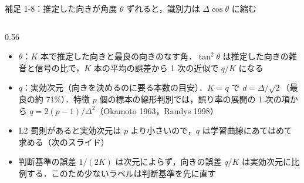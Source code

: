 \begin{frame}{補足 1-8：推定した向きが角度 $\theta$ ずれると，識別力は $\Delta\cos\theta$ に縮む}
\begin{columns}[T,onlytextwidth]
\begin{column}{0.56\textwidth}
\begin{itemize}
        \item $\theta$：$K$ 本で推定した向きと最良の向きのなす角．$\tan^2\theta$ は推定した向きの雑音と信号の比で，$K$ 本の平均の誤差から 1 次の近似で $q/K$ になる
        \item $q$：実効次元（向きを決めるのに要る本数の目安）．$K = q$ で $d = \Delta/\sqrt2$（最良の約 71\%）．特徴 $p$ 個の標本の線形判別では，誤り率の展開の 1 次の項から $q = 2(p-1)/\Delta^2$（Okamoto 1963，Raudys 1998）
        \item L2 罰則があると実効次元は $p$ より小さいので，$q$ は学習曲線にあてはめて求める（次のスライド）
        \item 判断基準の誤差 $1/(2K)$ は次元によらず，向きの誤差 $q/K$ は実効次元に比例する．このため少ないラベルは判断基準を先に直す
      \end{itemize}
    \end{column}
  \end{columns}
\end{frame}


